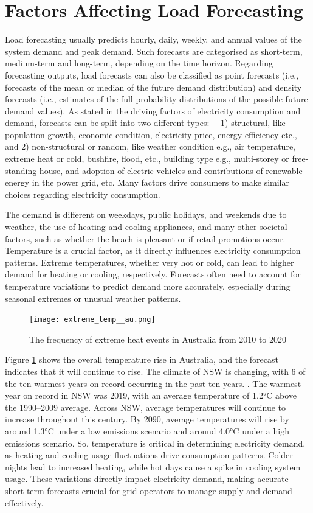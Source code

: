 \documentclass[mstat,12pt]{unswthesis}
\begin{document}
\section{Factors Affecting Load
Forecasting}\label{factors-affecting-load-forecasting}

Load forecasting usually predicts hourly, daily, weekly, and annual
values of the system demand and peak demand. Such forecasts are
categorised as short-term, medium-term and long-term, depending on the
time horizon. Regarding forecasting outputs, load forecasts can also be
classified as point forecasts (i.e., forecasts of the mean or median of
the future demand distribution) and density forecasts (i.e., estimates
of the full probability distributions of the possible future demand
values). As stated in \cite{nsw_epa_2021_energy_consumption} the driving
factors of electricity consumption and demand, forecasts can be split
into two different types: ---1) structural, like population growth,
economic condition, electricity price, energy efficiency etc., and 2)
non-structural or random, like weather condition e.g., air temperature,
extreme heat or cold, bushfire, flood, etc., building type e.g.,
multi-storey or free-standing house, and adoption of electric vehicles
and contributions of renewable energy in the power grid, etc. Many
factors drive consumers to make similar choices regarding electricity
consumption.

The demand is different on weekdays, public holidays, and weekends due
to weather, the use of heating and cooling appliances, and many other
societal factors, such as whether the beach is pleasant or if retail
promotions occur. Temperature is a crucial factor, as it directly
influences electricity consumption patterns. Extreme temperatures,
whether very hot or cold, can lead to higher demand for heating or
cooling, respectively. Forecasts often need to account for temperature
variations to predict demand more accurately, especially during seasonal
extremes or unusual weather patterns.

\begin{figure}[H]
\centering
\texttt{[image: extreme\_temp\_\_au.png]}
\caption{The frequency of extreme heat events in Australia from 2010 to 2020}\label{extreme}
\end{figure}

Figure \ref{extreme} shows the overall temperature rise in Australia,
and the forecast indicates that it will continue to rise. The climate of
NSW is changing, with 6 of the ten warmest years on record occurring in
the past ten years. \cite{nswAdaptNSW}. The warmest year on record in
NSW was 2019, with an average temperature of 1.2°C above the 1990--2009
average. Across NSW, average temperatures will continue to increase
throughout this century. By 2090, average temperatures will rise by
around 1.3°C under a low emissions scenario and around 4.0°C under a
high emissions scenario. So, temperature is critical in determining
electricity demand, as heating and cooling usage fluctuations drive
consumption patterns. Colder nights lead to increased heating, while hot
days cause a spike in cooling system usage. These variations directly
impact electricity demand, making accurate short-term forecasts crucial
for grid operators to manage supply and demand effectively.
\end{document}
